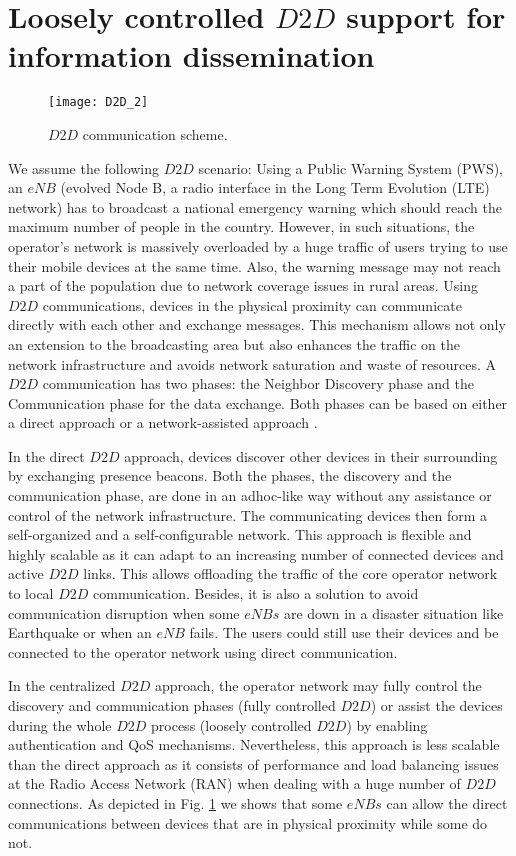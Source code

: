 \documentclass[review]{elsarticle}
\begin{document}
\section{Loosely controlled $D2D$ support for information dissemination}\label{sec:D2Dscenario}
\begin{figure}\centering
    \texttt{[image: D2D\_2]}
    \caption{$D2D$ communication scheme.}
    \label{fig:d2d}
\end{figure}
We assume the following $D2D$ scenario: Using a Public Warning System (PWS), an $eNB$ (evolved Node B, a radio interface in the Long Term Evolution (LTE) network) has to broadcast a national emergency warning which should reach the maximum number of people in the country. However, in such situations, the operator's network is massively overloaded by a huge traffic of users trying to use their mobile devices at the same time. Also, the warning message may not reach a part of the population due to network coverage issues in rural areas.
Using $D2D$ communications, devices in the physical proximity can communicate directly with each other and exchange messages. This mechanism allows not only an extension to the broadcasting area but also enhances the traffic on the network infrastructure and avoids network saturation and waste of resources. A $D2D$ communication has two phases: the Neighbor Discovery phase and the Communication phase for the data exchange. Both phases can be based on either a direct approach or a network-assisted approach \cite{Fodor2102,Lei2012,3GPP13,3GPP14,Toukabri14}.

In the direct $D2D$ approach, devices discover other devices in their surrounding by exchanging presence beacons. Both the phases, the discovery and the communication phase, are done in an adhoc-like way without any assistance or control of the network infrastructure. The communicating devices then form a self-organized and a self-configurable network. This approach is flexible and highly scalable as it can adapt to an increasing number of connected devices and active $D2D$ links. This allows offloading the traffic of the core operator network to local $D2D$ communication. Besides, it is also a solution to avoid communication disruption when some $eNBs$ are down in a disaster situation like Earthquake or when an $eNB$ fails. The users could still use their devices and be connected to the operator network using direct communication.

In the centralized $D2D$ approach, the operator network may fully control the discovery and communication phases (fully controlled $D2D$) or assist the devices during the whole $D2D$ process (loosely controlled $D2D$) by enabling authentication and QoS mechanisms. Nevertheless, this approach is less scalable than the direct approach as it consists of performance and load balancing issues at the Radio Access Network (RAN) when dealing with a huge number of $D2D$ connections. As depicted in Fig. \ref{fig:d2d} we shows that some $eNBs$ can allow the direct communications between devices that are in physical proximity while some do not.
\end{document}
